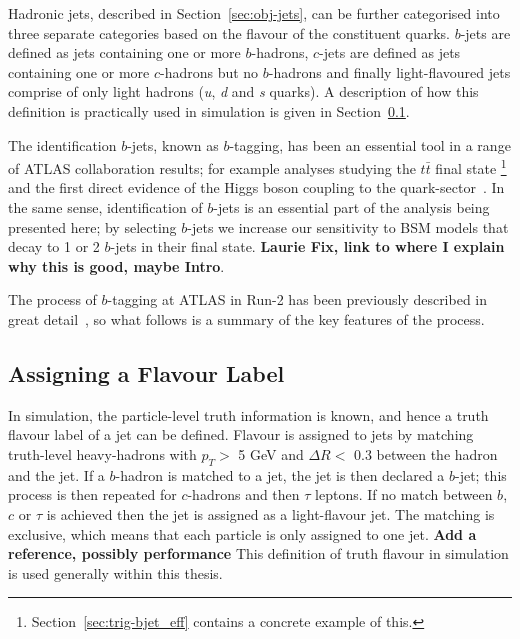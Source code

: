 Hadronic jets, described in Section~\ref{sec:obj-jets}, can be further categorised into three separate categories based on the flavour of the constituent quarks.
$b$-jets are defined as jets containing one or more $b$-hadrons,
$c$-jets are defined as jets containing one or more $c$-hadrons but no $b$-hadrons
and finally light-flavoured jets comprise of only light hadrons (\textit{u}, \textit{d} and \textit{s} quarks).
A description of how this definition is practically used in simulation is given in Section~\ref{sec:obj-bjets_label}.

The identification $b$-jets, known as $b$-tagging, has been an essential tool in a range of ATLAS collaboration results;
for example analyses studying the $t\bar{t}$ final state \cite{obj-ttbar} \footnote{Section~\ref{sec:trig-bjet_eff} contains a concrete example of this.}
and the first direct evidence of the Higgs boson coupling to the quark-sector~\cite{obj-Hbb}.
In the same sense, identification of $b$-jets is an essential part of the analysis being presented here;
by selecting $b$-jets we increase our sensitivity to BSM models that decay to 1 or 2 $b$-jets in their final state.
\textbf{Laurie Fix, link to where I explain why this is good, maybe Intro}.

The process of $b$-tagging at ATLAS in Run-2 has been previously described in great
detail~\cite{obj-bjets_algo_2015,obj-bjets_algo_2016},
so what follows is a summary of the key features of the process.

\subsection{Assigning a Flavour Label}
\label{sec:obj-bjets_label}

In simulation, the particle-level truth information is known, and hence a truth flavour label of a jet can be defined.
Flavour is assigned to jets by matching truth-level heavy-hadrons with $p_{T} >$ 5 GeV and $\Delta R <$ 0.3 between the hadron and the jet.
If a $b$-hadron is matched to a jet, the jet is then declared a $b$-jet;
this process is then repeated for $c$-hadrons and then $\tau$ leptons.
If no match between $b$, $c$ or $\tau$ is achieved then the jet is assigned as a light-flavour jet.
The matching is exclusive, which means that each particle is only assigned to one jet. \textbf{Add a reference, possibly performance}
This definition of truth flavour in simulation is used generally within this thesis.
   
